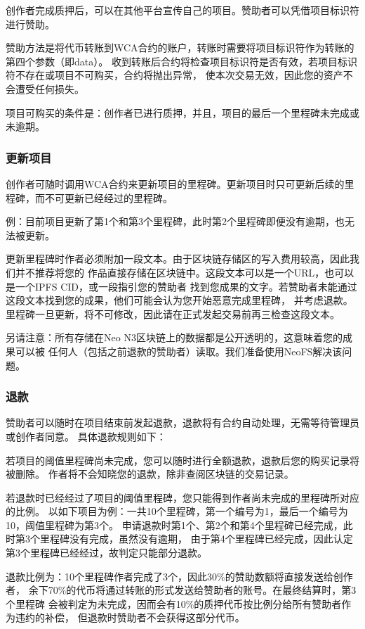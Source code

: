 创作者完成质押后，可以在其他平台宣传自己的项目。赞助者可以凭借项目标识符进行赞助。

赞助方法是将代币转账到WCA合约的账户，转账时需要将项目标识符作为转账的第四个参数（即data）。
收到转账后合约将检查项目标识符是否有效，若项目标识符不存在或项目不可购买，合约将抛出异常，
使本次交易无效，因此您的资产不会遭受任何损失。

项目可购买的条件是：创作者已进行质押，并且，项目的最后一个里程碑未完成或未逾期。

\subsubsection{更新项目}

创作者可随时调用WCA合约来更新项目的里程碑。更新项目时只可更新后续的里程碑，而不可更新已经经过的里程碑。

例：目前项目更新了第1个和第3个里程碑，此时第2个里程碑即便没有逾期，也无法被更新。

更新里程碑时作者必须附加一段文本。由于区块链存储区的写入费用较高，因此我们并不推荐将您的
作品直接存储在区块链中。这段文本可以是一个URL，也可以是一个IPFS CID，或一段指引您的赞助者
找到您成果的文字。若赞助者未能通过这段文本找到您的成果，他们可能会认为您开始恶意完成里程碑，
并考虑退款。里程碑一旦更新，将不可修改，因此请在正式发起交易前再三检查这段文本。

另请注意：所有存储在Neo N3区块链上的数据都是公开透明的，这意味着您的成果可以被
任何人（包括之前退款的赞助者）读取。我们准备使用NeoFS解决该问题。

\subsubsection{退款}

赞助者可以随时在项目结束前发起退款，退款将有合约自动处理，无需等待管理员或创作者同意。
具体退款规则如下：

若项目的阈值里程碑尚未完成，您可以随时进行全额退款，退款后您的购买记录将被删除。
作者将不会知晓您的退款，除非查阅区块链的交易记录。

若退款时已经经过了项目的阈值里程碑，您只能得到作者尚未完成的里程碑所对应的比例。
以如下项目为例：一共10个里程碑，第一个编号为1，最后一个编号为10，阈值里程碑为第3个。
申请退款时第1个、第2个和第4个里程碑已经完成，此时第3个里程碑没有完成，虽然没有逾期，
由于第4个里程碑已经完成，因此认定第3个里程碑已经经过，故判定只能部分退款。

退款比例为：10个里程碑作者完成了3个，因此30\%的赞助数额将直接发送给创作者，
余下70\%的代币将通过转账的形式发送给赞助者的账号。在最终结算时，第3个里程碑
会被判定为未完成，因而会有10\%的质押代币按比例分给所有赞助者作为违约的补偿，
但退款时赞助者不会获得这部分代币。


